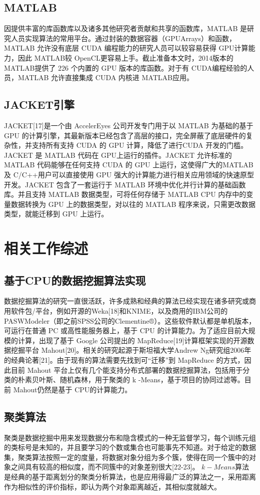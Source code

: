 \documentclass{article}
\begin{document}
\begin{multicols}{2}
    \subsection{MATLAB}
    因提供丰富的库函数库以及诸多其他研究者贡献和共享的函数库，MATLAB 是研究人员实现算法的常用平台。通过封装的数据容器（GPUArrays）和函数，MATLAB 允许没有底层 CUDA 编程能力的研究人员可以较容易获得 GPU计算能力，因此 MATLAB较 OpenCL更容易上手。截止准备本文时，2014版本的MATLAB提供了 226 个内置的 GPU 版本的库函数。对于有 CUDA编程经验的人员，MATLAB 允许直接集成 CUDA 内核进 MATLAB应用。

    \subsection{JACKET引擎}
    JACKET[17]是一个由 AccelerEyes 公司开发专门用于以 MATLAB 为基础的基于 GPU 的计算引擎，其最新版本已经包含了高层的接口，完全屏蔽了底层硬件的复杂性，并支持所有支持 CUDA 的 GPU 计算，降低了进行CUDA 开发的门槛。JACKET 是 MATLAB 代码在 GPU上运行的插件。JACKET 允许标准的 MATLAB 代码能够在任何支持 CUDA 的 GPU 上运行，这使得广大的MATLAB 及 C/C++用户可以直接使用 GPU 强大的计算能力进行相关应用领域的快速原型开发。JACKET 包含了一套运行于 MATLAB 环境中优化并行计算的基础函数库。并且支持 MATLAB 数据类型，可将任何存储于 MATLAB CPU 内存中的变量数据转换为 GPU 上的数据类型，对以往的 MATLAB 程序来说，只需更改数据类型，就能迁移到 GPU 上运行。

    \section{相关工作综述}
    \subsection{基于CPU的数据挖掘算法实现}
    数据挖掘算法的研究一直很活跃，许多成熟和经典的算法已经实现在诸多研究或商用软件包/平台，例如开源的Weka[18]和KNIME，以及商用的IBM公司的PASWModeler（即之前SPSS公司的Clementine®）。这些软件默认都是单机版本，可运行在普通 PC 或高性能服务器上，基于 CPU 的计算能力。为了适应目前大规模的计算，出现了基于 Google 公司提出的 MapReduce[19]计算框架实现的开源数据挖掘平台 Mahout[20]。相关的研究起源于斯坦福大学Andrew Ng研究组2006年的经典论著[21]。由于现有的算法需要先找到可“迁移”到 MapReduce 的方式，因此目前 Mahout 平台上仅有几个能支持分布式部署的数据挖掘算法，包括用于分类的朴素贝叶斯、随机森林，用于聚类的 k -Means，基于项目的协同过滤等。目前 Mahout仍然是基于 CPU的计算能力。

    \subsection{聚类算法}
    聚类是数据挖掘中用来发现数据分布和隐含模式的一种无监督学习，每个训练元组的类标号是未知的，并且要学习的个数或集合也可能事先不知道。对于给定的数据集，聚类算法按照一定的度量，将数据对象分组为多个簇，使得在同一个簇中的对象之间具有较高的相似度，而不同簇中的对象差别很大[22-23]。 $k-Means$算法是经典的基于距离划分的聚类分析算法，也是应用得最广泛的算法之一，采用距离作为相似性的评价指标，即认为两个对象距离越近，其相似度就越大。


\end{multicols}
\end{document}
